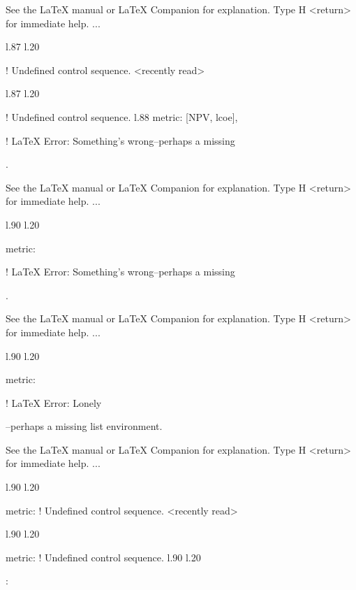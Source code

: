 {{{{{{{{{{{{{{{{{See the LaTeX manual or LaTeX Companion for explanation.
Type  H <return>  for immediate help.
 ...                                              
                                                  
l.87 l.20     \item \xmlNode
                            
! Undefined control sequence.
<recently read> \xmlNode 
                         
l.87 l.20     \item \xmlNode
                            
! Undefined control sequence.
l.88                        {metric}: \xmlDesc
                                              {[NPV, lcoe]},

! LaTeX Error: Something's wrong--perhaps a missing \item.

See the LaTeX manual or LaTeX Companion for explanation.
Type  H <return>  for immediate help.
 ...                                              
                                                  
l.90 l.20     \item \xmlNode
                            {metric}: \xmlDesc

! LaTeX Error: Something's wrong--perhaps a missing \item.

See the LaTeX manual or LaTeX Companion for explanation.
Type  H <return>  for immediate help.
 ...                                              
                                                  
l.90 l.20     \item \xmlNode
                            {metric}: \xmlDesc

! LaTeX Error: Lonely \item--perhaps a missing list environment.

See the LaTeX manual or LaTeX Companion for explanation.
Type  H <return>  for immediate help.
 ...                                              
                                                  
l.90 l.20     \item \xmlNode
                            {metric}: \xmlDesc
! Undefined control sequence.
<recently read> \xmlNode 
                         
l.90 l.20     \item \xmlNode
                            {metric}: \xmlDesc
! Undefined control sequence.
l.90 l.20     \item {}: \xmlDesc
                                              
}}}}}}}}}}}}}}}}}
